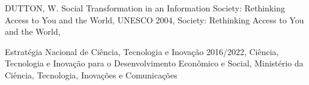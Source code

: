 \documentclass[
12pt,		%
openright,	%
twoside,  %
a4paper,			%
chapter=TITLE,		%
english,			%
french,				%
spanish,			%
brazil				%
]{USPSC-classe/USPSC}
\begin{document}
\begin{flushleft}
\begin{flushleft}
\begin{flushleft}
\begin{flushleft}
\begin{flushleft}
\begin{flushleft}
\begin{flushleft}
\begin{flushleft}
\begin{flushleft}
[DUTTON, 2004] DUTTON, W. Social Transformation in an Information Society: Rethinking Access to You and the World, UNESCO 2004, Society: Rethinking Access to You and the World, 
\end{flushleft}


\end{flushleft}


\end{flushleft}


\end{flushleft}


\end{flushleft}


\end{flushleft}


\end{flushleft}


\end{flushleft}


\end{flushleft}


\begin{flushleft}
\begin{flushleft}
\begin{flushleft}
\begin{flushleft}
\begin{flushleft}
\begin{flushleft}
\begin{flushleft}
\begin{flushleft}
\begin{flushleft}
[ENCTI, 2016] Estrat\'egia Nacional de Ci\^encia, Tecnologia e Inova\c{c}\~ao 2016/2022, Ci\^encia, Tecnologia e Inova\c{c}\~ao para o Desenvolvimento Econ\^omico e Social, Minist\'erio da Ci\^encia, Tecnologia, Inova\c{c}\~oes e Comunica\c{c}\~oes
\end{flushleft}


\end{flushleft}


\end{flushleft}


\end{flushleft}


\end{flushleft}


\end{flushleft}


\end{flushleft}


\end{flushleft}


\end{flushleft}
\end{document}
